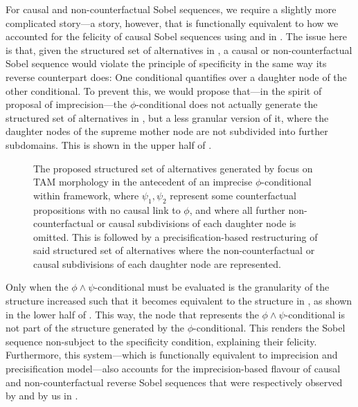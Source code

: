 For causal and non-counterfactual Sobel sequences, we require a slightly more complicated story---a story, however, that is functionally equivalent to how we accounted for the felicity of causal Sobel sequences using \textcite{Bennett2003} and \textcite{Arregui2009} in . The issue here is that, given the structured set of alternatives in , a causal or non-counterfactual Sobel sequence would violate the principle of specificity in the same way its reverse counterpart does: One conditional quantifies over a daughter node of the other conditional. To prevent this, we would propose that---in the spirit of  proposal of imprecision---the $\phi$-conditional does not actually generate the structured set of alternatives in , but a less granular version of it, where the daughter nodes of the supreme mother node are not subdivided into further subdomains. This is shown in the upper half of .
\begin{figure}[!htb]
    \centering
    
    \caption{The proposed structured set of alternatives generated by focus on TAM morphology in the antecedent of an imprecise $\phi$-conditional within  framework, where $\psi_1,\psi_2$ represent some counterfactual propositions with no causal link to $\phi$, and where all further non-counterfactual or causal subdivisions of each daughter node is omitted. This is followed by a precisification-based restructuring of said structured set of alternatives where the non-counterfactual or causal subdivisions of each daughter node are represented.}
\end{figure}
Only when the $\phi\land\psi$-conditional must be evaluated is the granularity of the structure increased such that it becomes equivalent to the structure in , as shown in the lower half of . This way, the node that represents the $\phi\land\psi$-conditional is not part of the structure generated by the $\phi$-conditional. This renders the Sobel sequence non-subject to the specificity condition, explaining their felicity. Furthermore, this system---which is functionally equivalent to  imprecision and precisification model---also accounts for the imprecision-based flavour of causal and non-counterfactual reverse Sobel sequences that were respectively observed by \textcite{Klecha2014,Klecha2015} and by us in .

